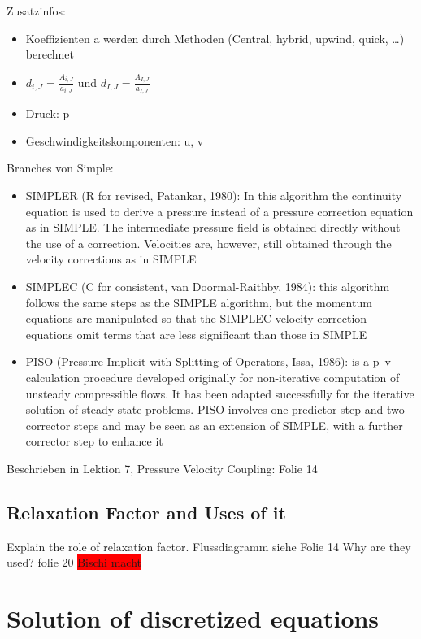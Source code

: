 \documentclass[a4paper]{scrartcl}
\begin{document}
Zusatzinfos:\\
\begin{itemize}
  \item Koeffizienten a werden durch Methoden (Central, hybrid, upwind, quick,
  \ldots) berechnet
  \item $d_{i,J} = \frac{A_{i,J}}{a_{i,J}}$ und $d_{I,J} =
  \frac{A_{I,J}}{a_{I,J}}$
  \item Druck: p
  \item Geschwindigkeitskomponenten: u, v
\end{itemize}

Branches von Simple:\\
\begin{itemize}
  \item SIMPLER (R for revised, Patankar, 1980): In this algorithm the
  continuity equation is used to derive a pressure instead of a pressure correction equation as in SIMPLE. The intermediate pressure field is obtained directly without the use of a correction. Velocities are, however, still obtained through the velocity corrections as in SIMPLE
  \item SIMPLEC (C for consistent, van Doormal-Raithby, 1984): this algorithm
  follows the same steps as the SIMPLE algorithm, but the momentum equations are manipulated so that the SIMPLEC velocity correction equations omit terms that are less significant than those in SIMPLE
  \item PISO (Pressure Implicit with Splitting of Operators, Issa, 1986): is a
  p–v calculation procedure developed originally for non-iterative computation of unsteady compressible flows. It has been adapted successfully for the iterative solution of steady state problems. PISO involves one predictor step and two corrector steps and may be seen as an extension of SIMPLE, with a further corrector step to enhance it
\end{itemize}

Beschrieben in Lektion 7, Pressure Velocity Coupling: Folie 14


\subsection{Relaxation Factor and Uses of it}
Explain the role of relaxation factor. 
Flussdiagramm siehe Folie 14
 Why are they used?
folie 20
\colorbox{red}{Bischi macht}


\section{Solution of discretized equations}
\end{document}
